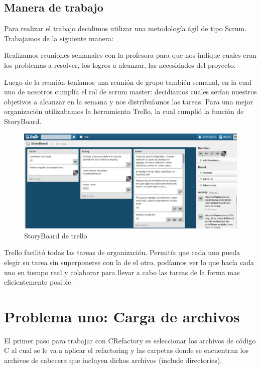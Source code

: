 \documentclass[a4paper,oneside,10pt]{article}
\begin{document}
\subsection{Manera de trabajo}

Para realizar el trabajo decidimos utilizar una metodología \'agil de tipo Scrum. Trabajamos de la siguiente manera: 

Realizamos reuniones semanales con la profesora para que nos indique cuales eran los problemas a resolver, los logros a alcanzar, las necesidades del proyecto.

Luego de la reunión teníamos una reunión de grupo también semanal, en la cual uno de nosotros cumplía el rol de scrum master: decidiamos cuales serían nuestros objetivos a alcanzar en la semana y nos distribuíamos las tareas. Para una mejor organización utilizabamos la herramienta Trello, la cual cumplió la función de StoryBoard.

\begin{figure}[h!]
  \centering
    \includegraphics[scale=0.27]{images/trello.png}
    \caption{StoryBoard de trello}
\end{figure}


Trello facilitó todas las tareas de organización. Permitía que cada uno pueda elegir su tarea sin superponerse con la de el otro, podíamos ver lo que hacía cada uno en tiempo real y colaborar para llevar a cabo las tareas de la forma mas eficientemente posible. 



\section{Problema uno: Carga de archivos}

El primer paso para trabajar con CRefactory es seleccionar los archivos de c\'odigo C al cual se le va a aplicar el refactoring y las carpetas donde se encuentran los archivos de cabecera que incluyen dichos archivos (include directories).
\end{document}
